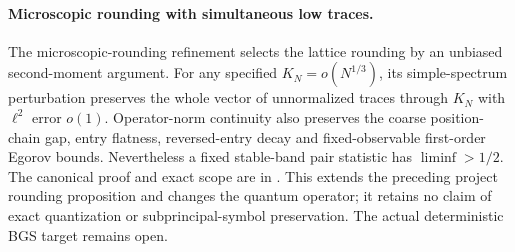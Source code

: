 \paragraph{Microscopic rounding with simultaneous low traces.}
The microscopic-rounding refinement selects the lattice rounding by an
unbiased second-moment argument. For any specified $K_N=o(N^{1/3})$,
its simple-spectrum perturbation preserves the whole vector of
unnormalized traces through $K_N$ with $\ell^2$ error $o(1)$.
Operator-norm continuity also preserves the coarse position-chain gap,
entry flatness, reversed-entry decay and fixed-observable first-order
Egorov bounds. Nevertheless a fixed stable-band pair statistic has
$\liminf>1/2$. The canonical proof and exact scope are in
.
This extends the preceding project rounding proposition and changes the
quantum operator; it retains no claim of exact quantization or
subprincipal-symbol preservation. The actual deterministic BGS target
remains open.
